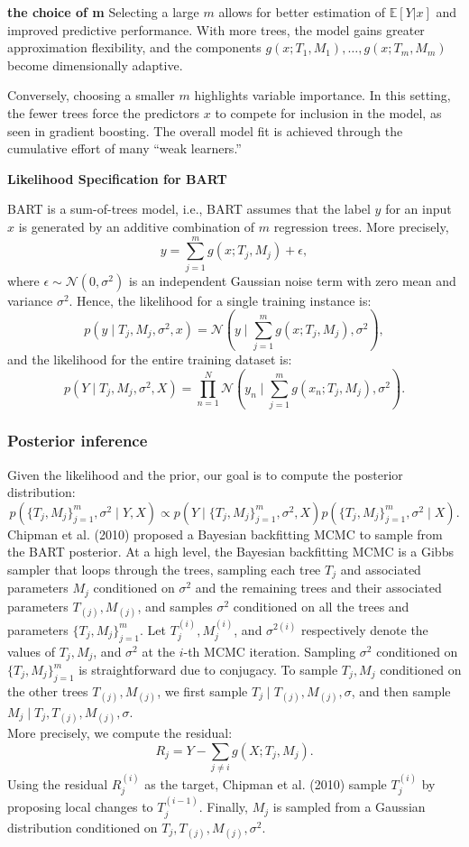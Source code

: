 \documentclass[a4paper,11pt]{article}
\begin{document}
\textbf{the choice of m} Selecting a large \(m\) allows for better estimation of \(\mathbb{E}[Y|x]\) and improved predictive performance. With more trees, the model gains greater approximation flexibility, and the components \(g(x; T_1, M_1), \dots, g(x; T_m, M_m)\) become dimensionally adaptive. 

Conversely, choosing a smaller \(m\) highlights variable importance. In this setting, the fewer trees force the predictors \(x\) to compete for inclusion in the model, as seen in gradient boosting. The overall model fit is achieved through the cumulative effort of many “weak learners.”

\textbf{Likelihood Specification for BART}

BART is a sum-of-trees model, i.e., BART assumes that the label \( y \) for an input \( x \) is generated by an additive combination of \( m \) regression trees. More precisely,
\[
y = \sum_{j=1}^{m} g(x; T_j, M_j) + \epsilon,
\]
where \( \epsilon \sim \mathcal{N}(0, \sigma^2) \) is an independent Gaussian noise term with zero mean and variance \( \sigma^2 \). Hence, the likelihood for a single training instance is:
\[
p(y \mid T_j, M_j, \sigma^2, x) = \mathcal{N}\left(y \mid \sum_{j=1}^{m} g(x; T_j, M_j), \sigma^2\right),
\]
and the likelihood for the entire training dataset is:
\[
p(Y \mid T_j, M_j, \sigma^2, X) = \prod_{n=1}^{N} \mathcal{N}\left(y_n \mid \sum_{j=1}^{m} g(x_n; T_j, M_j), \sigma^2\right).
\]


\subsubsection{Posterior inference}

Given the likelihood and the prior, our goal is to compute the posterior distribution:
\[
p\left( \{T_j, M_j \}_{j=1}^{m}, \sigma^2 \mid Y, X\right) \propto p\left(Y \mid \{ T_j, M_j \}_{j=1}^{m}, \sigma^2, X\right) p\left(\{T_j, M_j \}_{j=1}^{m}, \sigma^2 \mid X\right).
\]
Chipman et al. (2010) proposed a Bayesian backfitting MCMC to sample from the BART posterior. At a high level, the Bayesian backfitting MCMC is a Gibbs sampler that loops through the trees, sampling each tree \( T_j \) and associated parameters \( M_j \) conditioned on \( \sigma^2 \) and the remaining trees and their associated parameters \( T_{(j)}, M_{(j)}  \), and samples \( \sigma^2 \) conditioned on all the trees and parameters \( \{ T_j, M_j \}_{j=1}^{m} \).
Let \( T_j^{(i)}, M_j^{(i)} \), and \( \sigma^{2(i)} \) respectively denote the values of \( T_j, M_j \), and \( \sigma^2 \) at the \( i \)-th MCMC iteration. Sampling \( \sigma^2 \) conditioned on \( \{T_j, M_j \}_{j=1}^{m} \) is straightforward due to conjugacy.
To sample \( T_j, M_j \) conditioned on the other trees \( T_{(j)}, M_{(j)}  \), we first sample $T_j \mid T_{(j)}, M_{(j)}  , \sigma$, and then sample $M_j \mid T_j, T_{(j)}, M_{(j)},  \sigma$.
\\More precisely, we compute the residual:
\[
R_j = Y - \sum_{j \neq i} g(X; T_j, M_j).
\]
Using the residual \( R_j^{(i)} \) as the target, Chipman et al. (2010) sample \( T_j^{(i)} \) by proposing local changes to \( T_j^{(i-1)} \).
Finally, \( M_j \) is sampled from a Gaussian distribution conditioned on \( T_j, T_{(j)}, M_{(j)}  , \sigma^2 \).
\end{document}
